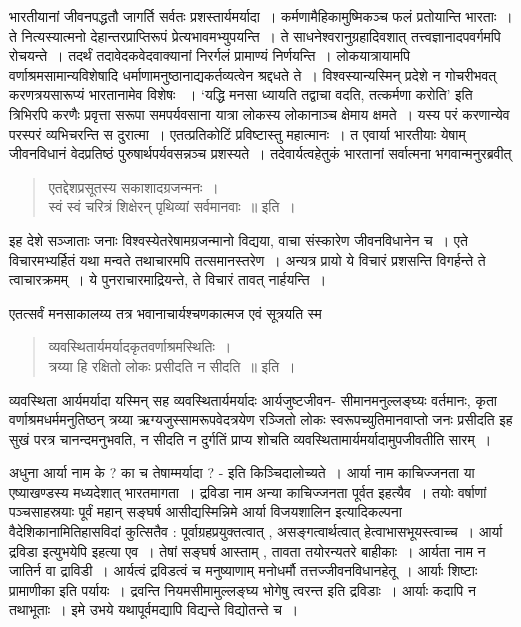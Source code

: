{भारतीयानां जीवनपद्धतौ जागर्ति सर्वतः प्रशस्तार्यमर्यादा~। कर्मणामैहिकामुष्मिकञ्च फलं प्रतोयान्ति भारताः~। ते नित्यस्यात्मनो देहान्तरप्राप्तिरूपं प्रेत्यभावमभ्युपयन्ति~। ते साधनेश्वरानुग्रहादिवशात् तत्त्वज्ञानादपवर्गमपि रोचयन्ते~। तदर्थं तदावेदकवेदवाक्यानां निरर्गलं प्रामाण्यं निर्णयन्ति~। लोकयात्रायामपि वर्णाश्रमसामान्यविशेषादि धर्माणामनुष्ठानाद्यकर्तव्यत्वेन श्रद्दधते ते~। विश्वस्यान्यस्मिन् प्रदेशे न गोचरीभवत् करणत्रयसारूप्यं भारतानामेव विशेषः ~। ‘यद्धि मनसा ध्यायति  तद्वाचा वदति, तत्कर्मणा करोति’ इति त्रिभिरपि करणैः प्रवृत्ता सरूपा समपर्यवसाना यात्रा लोकस्य लोकानाञ्च क्षेमाय क्षमते~। यस्य परं करणान्येव परस्परं व्यभिचरन्ति स दुरात्मा~। एतत्प्रतिकोटिं प्रविष्टास्तु महात्मानः~। त एवार्या भारतीयाः येषाम् जीवनविधानं वेदप्रतिष्ठं पुरुषार्थपर्यवसन्नञ्च प्रशस्यते~। तदेवार्यत्वहेतुकं भारतानां सर्वात्मना भगवान्मनुरब्रवीत्  
\begin{verse}
एतद्देशप्रसूतस्य सकाशादग्रजन्मनः~। \\
स्वं स्वं चरित्रं शिक्षेरन् पृथिव्यां सर्वमानवाः~॥ इति~। 
\end{verse}
इह देशे सञ्जाताः जनाः विश्वस्येतरेषामग्रजन्मानो विद्यया, वाचा संस्कारेण जीवनविधानेन च~। एते विचारमभ्यर्हितं यथा मन्वते तथाचारमपि तत्समानस्तरेण~। अन्यत्र प्रायो ये विचारं प्रशसन्ति विगर्हन्ते ते त्वाचारक्रमम्~। ये पुनराचारमाद्रियन्ते, ते विचारं तावत् नार्हयन्ति~। 

एतत्सर्वं मनसाकालय्य तत्र भवानाचार्यश्चणकात्मज एवं सूत्रयति स्म 
\begin{verse}
व्यवस्थितार्यमर्यादकृतवर्णाश्रमस्थितिः~। \\
त्रय्या हि रक्षितो लोकः प्रसीदति न सीदति~॥ इति~। 
\end{verse}
व्यवस्थिता आर्यमर्यादा यस्मिन् सह व्यवस्थितार्यमर्यादः आर्यजुष्टजीवन- सीमानमनुल्लङ्घ्यः वर्तमानः, कृता वर्णाश्रमधर्ममनुतिष्ठन् त्रय्या ऋग्यजुस्सामरूपवेदत्रयेण रञ्जितो लोकः स्वरूपच्युतिमानवाप्तो जनः प्रसीदति इह सुखं परत्र चानन्दमनुभवति, न सीदति न दुर्गतिं प्राप्य शोचति व्यवस्थितामार्यमर्यादामुपजीवतीति सारम्~। 

अधुना आर्या नाम के ? का च तेषाम्मर्यादा ? - इति किञ्चिदालोच्यते~। आर्या नाम काचिज्जनता या एष्याखण्डस्य मध्यदेशात् भारतमागता~। द्रविडा नाम अन्या काचिज्जनता पूर्वत इहत्यैव~। तयोः वर्षाणां पञ्चसाहस्रयाः पूर्वं महान् सङ्घर्ष आसीद्यस्मिन्निमे आर्या विजयशालिन इत्यादिकल्पना वैदेशिकानामितिहासविदां कुत्सितैव : पूर्वाग्रहप्रयुक्तत्वात् , असङ्गत्वार्थत्वात् हेत्वाभासभूयस्त्वाच्च~। आर्या द्रविडा इत्युभयेपि इहत्या एव~। तेषां सङ्घर्ष आस्ताम् , तावता तयोरन्यतरे बाहीकाः~। आर्यता नाम न जातिर्न वा द्राविडी~। आर्यत्वं द्रविडत्वं च मनुष्याणाम् मनोधर्मौ तत्तज्जीवनविधानहेतू~। आर्याः शिष्टाः प्रामाणीका इति पर्यायः~। द्रवन्ति नियमसीमामुल्लङ्घ्य भोगेषु त्वरन्त इति द्रविडाः~। आर्याः कदापि न तथाभूताः~। इमे उभये यथापूर्वमद्यापि विद्यन्ते विद्योतन्ते च~। 

}
